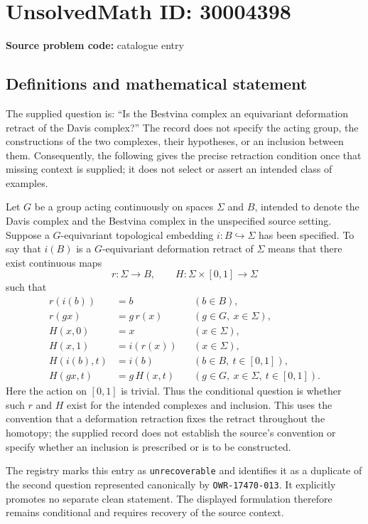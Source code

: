 \documentclass[11pt]{article}
\begin{document}
\section*{UnsolvedMath ID: 30004398}
\textbf{Source problem code:} catalogue entry
\subsection{Definitions and mathematical statement}
The supplied question is: ``Is the Bestvina complex an equivariant deformation retract of the Davis complex?'' The record does not specify the acting group, the constructions of the two complexes, their hypotheses, or an inclusion between them. Consequently, the following gives the precise retraction condition once that missing context is supplied; it does not select or assert an intended class of examples.

Let \(G\) be a group acting continuously on spaces \(\Sigma\) and \(B\), intended to denote the Davis complex and the Bestvina complex in the unspecified source setting. Suppose a \(G\)-equivariant topological embedding \(i\colon B\hookrightarrow\Sigma\) has been specified. To say that \(i(B)\) is a \(G\)-equivariant deformation retract of \(\Sigma\) means that there exist continuous maps
\[
r\colon\Sigma\longrightarrow B,
\qquad H\colon\Sigma\times[0,1]\longrightarrow\Sigma
\]
such that
\[
\begin{aligned}
r(i(b))&=b &&(b\in B),\\
r(gx)&=g\,r(x) &&(g\in G,\ x\in\Sigma),\\
H(x,0)&=x &&(x\in\Sigma),\\
H(x,1)&=i(r(x)) &&(x\in\Sigma),\\
H(i(b),t)&=i(b) &&(b\in B,\ t\in[0,1]),\\
H(gx,t)&=g\,H(x,t) &&(g\in G,\ x\in\Sigma,\ t\in[0,1]).
\end{aligned}
\]
Here the action on \([0,1]\) is trivial. Thus the conditional question is whether such \(r\) and \(H\) exist for the intended complexes and inclusion. This uses the convention that a deformation retraction fixes the retract throughout the homotopy; the supplied record does not establish the source's convention or specify whether an inclusion is prescribed or is to be constructed.

The registry marks this entry as \texttt{unrecoverable} and identifies it as a duplicate of the second question represented canonically by \texttt{OWR-17470-013}. It explicitly promotes no separate clean statement. The displayed formulation therefore remains conditional and requires recovery of the source context.
\end{document}
